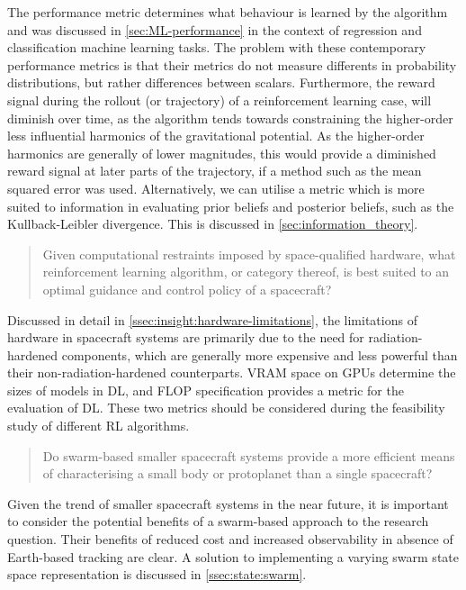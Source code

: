 The performance metric determines what behaviour is learned by the algorithm and was discussed in \autoref{sec:ML-performance} in the context of regression and classification machine learning tasks. The problem with these contemporary performance metrics is that their metrics do not measure differents in probability distributions, but rather differences between scalars. Furthermore, the reward signal during the rollout (or trajectory) of a reinforcement learning case, will diminish over time, as the algorithm tends towards constraining the higher-order less influential harmonics of the gravitational potential. As the higher-order harmonics are generally of lower magnitudes, this would provide a diminished reward signal at later parts of the trajectory, if a method such as the mean squared error was used. Alternatively, we can utilise a metric which is more suited to information in evaluating prior beliefs and posterior beliefs, such as the Kullback-Leibler divergence. This is discussed in \autoref{sec:information_theory}.


\begin{quote}
    Given computational restraints imposed by space-qualified hardware, what reinforcement learning algorithm, or category thereof, is best suited to an optimal guidance and control policy of a spacecraft?
\end{quote}

Discussed in detail in \autoref{ssec:insight:hardware-limitations}, the limitations of hardware in spacecraft systems are primarily due to the need for radiation-hardened components, which are generally more expensive and less powerful than their non-radiation-hardened counterparts. \gls{VRAM} space on \glspl{GPU} determine the sizes of models in \gls{DL}, and \gls{FLOP} specification provides a metric for the evaluation of \gls{DL}. These two metrics should be considered during the feasibility study of different \gls{RL} algorithms.

\begin{quote}
    Do swarm-based smaller spacecraft systems provide a more efficient means of characterising a small body or protoplanet than a single spacecraft?
\end{quote}

Given the trend of smaller spacecraft systems in the near future, it is important to consider the potential benefits of a swarm-based approach to the research question. Their benefits of reduced cost and increased observability in absence of Earth-based tracking are clear. A solution to implementing a varying swarm state space representation is discussed in \autoref{ssec:state:swarm}.





